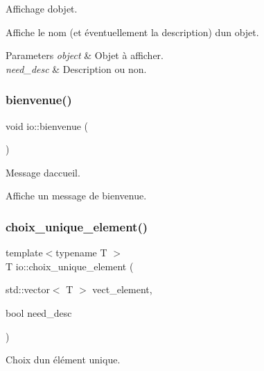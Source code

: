 Affichage d\textquotesingle{}objet. 

Affiche le nom (et éventuellement la description) d\textquotesingle{}un objet. 
\begin{DoxyParams}{Parameters}
{\em object} & Objet à afficher. \\
\hline
{\em need\+\_\+desc} & Description ou non. \\
\hline
\end{DoxyParams}
\mbox{\label{namespaceio_a7fdf85a0d766d2dcdb9870ae0458826a}} 
\subsubsection{\texorpdfstring{bienvenue()}{bienvenue()}}
{\footnotesize\ttfamily void io\+::bienvenue (\begin{DoxyParamCaption}{ }\end{DoxyParamCaption})}



Message d\textquotesingle{}accueil. 

Affiche un message de bienvenue. \mbox{\label{namespaceio_af398625b832f98bc758b9ea7665a168e}} 
\subsubsection{\texorpdfstring{choix\+\_\+unique\+\_\+element()}{choix\_unique\_element()}}
{\footnotesize\ttfamily template$<$typename T $>$ \\
T io\+::choix\+\_\+unique\+\_\+element (\begin{DoxyParamCaption}\item[{std\+::vector$<$ T $>$}]{vect\+\_\+element,  }\item[{bool}]{need\+\_\+desc }\end{DoxyParamCaption})}



Choix d\textquotesingle{}un élément unique. 


